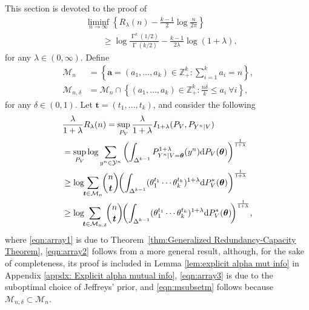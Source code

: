 \documentclass[journal, 10pt]{IEEEtran}
\newcommand{\bbZ}{\mathbb{Z}}
\newcommand{\rmd}{\mathrm{d}}
\newcommand{\cM}{\mathcal{M}}
\newcommand{\cY}{\mathcal{Y}}
\theoremstyle{plain}
\theoremstyle{plain}
\theoremstyle{plain}
\theoremstyle{plain}
\newcommand{\boldtheta}{\mathbold{\theta}}
\newcommand{\bolda}{\mathbold{a}}
\newcommand{\boldt}{\mathbold{t}}
\newcommand{\opGamma}{\operatorname{\Gamma}}
\newcommand{\simplex}{\operatorname{\Delta}}
\begin{document}
This section is devoted to the proof of
\begin{align}
&\liminf_{n\to \infty} \left\{  R_\lambda(n) -\frac{k-1}{2}\log \frac{n}{2\pi} \right\} \nonumber \\ 
&\qquad \ge \log\frac{\opGamma^k(1/2)}{\opGamma(k/2)}-\frac{k-1}{2\lambda}\log(1+\lambda)\text{,} \label{eqn:renyi-redundancy-conv}
\end{align}
for any $\lambda \in (0, \infty) $. Define
\begin{align}
\cM_n & =\left\{\bolda=(a_1, \hdots, a_k)\in \bbZ^k_+ \colon \sum_{i=1}^{k}a_i = n \right\}\text{,} \label{eqn:def:set M} \\
\cM_{n, \delta} & =  \cM_n \cap \left\{ (a_1, \hdots, a_k)\in \bbZ^k_+ \colon \frac{n\delta}{k}\leq a_i \ \forall i \right\}\text{,} \label{eqn:def:M_delta}
\end{align}
for any $\delta \in (0,1)$. Let $\boldt = (t_1, \ldots, t_k)$, and consider the following
\begin{align}
&\frac{\lambda}{1+\lambda} R_\lambda(n)=\sup_{P_V}\frac{\lambda}{1+\lambda} I_{1+\lambda}(P_V,P_{Y^n|V}) \label{eqn:array1} \\
&= \sup_{P_V} \log \sum_{y^n\in\cY^n} \left( \int_{\simplex^{k-1}}P_{Y^n|V=\boldtheta}^{1+\lambda}(y^n)\rmd P_V(\boldtheta) \right)^{\frac{1}{1+\lambda}} \label{eqn:array2} \\
&\ge \log\hspace{-1mm} \sum_{ \boldt \in\cM_n}\hspace{-1mm} \binom{n}{\boldt }\hspace{-0.5mm}
\bigg(\hspace{-0.5mm} \int_{\simplex^{k-1}}(\theta_1^{t_1}\cdots\theta_k^{t_k})^{1+\lambda}\rmd P^*_{V}(\boldtheta)\bigg)^{\frac{1}{1+\lambda}}  \label{eqn:array3} \\
&\ge \log \hspace{-1.2mm}\sum_{ \boldt \in\cM_{n, \delta}}\hspace{-1.2mm} \binom{n}{\boldt} \hspace{-0.5mm}
\bigg(\hspace{-0.5mm}\int_{\simplex^{k-1}}(\theta_1^{t_1}\cdots\theta_k^{t_k})^{1+\lambda}\rmd P^*_{V}(\boldtheta)\hspace{-0.5mm} \bigg)^{\frac{1}{1+\lambda}} \text{,} \label{eqn:msubsetm}
\end{align}
where \eqref{eqn:array1} is due to Theorem~\ref{thm:Generalized Redundancy-Capacity Theorem}, \eqref{eqn:array2} follows from a more general result\cite[Theorem 1]{Verdu2015}, although, for the sake of completeness, its proof is included in Lemma \ref{lem:explicit alpha mut info} in Appendix \ref{appdx: Explicit alpha mutual info}, \eqref{eqn:array3} is due to the suboptimal choice of Jeffreys' prior, and \eqref{eqn:msubsetm} follows because $\cM_{n, \delta}\subset\cM_n$. 
\end{document}

